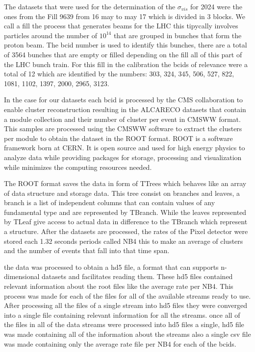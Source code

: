 The datasets that were used for the determination of the $\sigma_{vis}$ for 2024 were the ones from the Fill 9639 from 16 may to may 17 which is divided in 3 blocks. We call a fill the process that generates beams for the LHC this tipycally involves particles around the number of $10^{14}$ that are grouped in bunches that form the proton beam. The bcid number is used to identify this bunches, there are a total of 3564 bunches that are empty or filled depending on the fill all of this part of the LHC bunch train. For this fill in the calibration the bcids of relevance were a total of 12 which are identified by the numbers: 303, 324, 345, 506, 527, 822, 1081, 1102, 1397, 2000, 2965, 3123. 

In the case for our datasets each bcid is processed by the CMS collaboration to enable cluster reconstruction resulting in the ALCARECO datasets that contain a module collection and their number of cluster per event in CMSWW format. This samples are processed using the CMSWW software to extract the clusters per module to obtain the dataset in the ROOT format. ROOT is a software framework born at CERN. It is open source and used for high energy physics to analyze data while providing packages for storage, processing and visualization while minimizes the computing resources needed. 

The ROOT format saves the data in form of TTrees which behaves like an array of data structure and storage data. This tree consist on branches and leaves, a branch is a list of independent columns that can contain values of any fundamental type and are represented by TBranch. While the leaves represented by TLeaf give access to actual data in difference to the TBranch which represent a structure. After the datasets are processed, the rates of the Pixel detector were stored each 1.32 seconds periods called NB4 this to make an average of clusters and the number of events that fall into that time span. 

the data was processed to obtain a hd5 file, a format that can supports n-dimensional datasets and facilitates reading them. These hd5 files contained relevant information about the root files like the average rate per NB4. This process was made for each of the files for all of the available streams ready to use. After processing all the files of a single stream into hd5 files they were converged into a single file containing relevant information for all the streams. once all of the files in all of the data streams were processed into hd5 files a single, hd5 file was made containing all of the information about the streams also a single csv file was made containing only the average rate file per NB4 for each of the bcids.  

